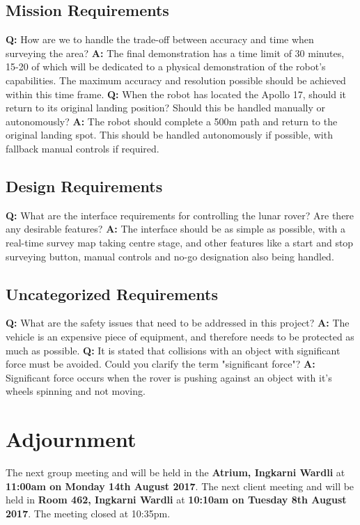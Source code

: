 \documentclass{article}
\begin{document}
    \subsection{Mission Requirements}
    	\textbf{Q:} How are we to handle the trade-off between accuracy and time when surveying the area? \newline
        \textbf{A:} The final demonstration has a time limit of 30 minutes, 15-20 of which will be dedicated to a physical demonstration of the robot's capabilities. The maximum accuracy and resolution possible should be achieved within this time frame.\newline
    	\textbf{Q:} When the robot has located the Apollo 17, should it return to its original landing position? Should this be handled manually or autonomously?\newline
        \textbf{A:} The robot should complete a 500m path and return to the original landing spot. This should be handled autonomously if possible, with fallback manual controls if required.  \newline
        
    \subsection{Design Requirements}
    	\textbf{Q:} What are the interface requirements for controlling the lunar rover? Are there any desirable features?\newline
        \textbf{A:} The interface should be as simple as possible, with a real-time survey map taking centre stage, and other features like a start and stop surveying button, manual controls and no-go designation also being handled.  \newline 
        
    \subsection{Uncategorized Requirements}
    	\textbf{Q:} What are the safety issues that need to be addressed in this project? \newline
        \textbf{A:} The vehicle is an expensive piece of equipment, and therefore needs to be protected as much as possible. \newline
    	\textbf{Q:} It is stated that collisions with an object with significant force must be avoided. Could you clarify the term "significant force"? \newline
        \textbf{A:} Significant force occurs when the rover is pushing against an object with it's wheels spinning and not moving. \newline
\section{Adjournment}
	The next group meeting and will be held in the {\bf Atrium, Ingkarni Wardli} at {\bf 11:00am on Monday 14th August 2017}.\newline
    The next client meeting and will be held in {\bf Room 462, Ingkarni Wardli} at {\bf 10:10am on Tuesday 8th August 2017}.\newline
The meeting closed at 10:35pm.
\end{document}
